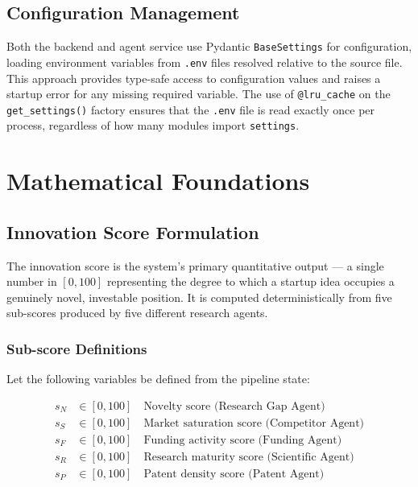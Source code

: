 \documentclass[12pt,a4paper,oneside]{book}
\begin{document}
\section{Configuration Management}

Both the backend and agent service use Pydantic \texttt{BaseSettings} for configuration, loading environment variables from \texttt{.env} files resolved relative to the source file. This approach provides type-safe access to configuration values and raises a startup error for any missing required variable. The use of \texttt{@lru\_cache} on the \texttt{get\_settings()} factory ensures that the \texttt{.env} file is read exactly once per process, regardless of how many modules import \texttt{settings}.

\chapter{Mathematical Foundations}
\label{chap:math}

\section{Innovation Score Formulation}

The innovation score is the system's primary quantitative output — a single number in $[0, 100]$ representing the degree to which a startup idea occupies a genuinely novel, investable position. It is computed deterministically from five sub-scores produced by five different research agents.

\subsection{Sub-score Definitions}

Let the following variables be defined from the pipeline state:

\begin{align}
  s_N     &\in [0,100] \quad \text{Novelty score (Research Gap Agent)} \\
  s_S     &\in [0,100] \quad \text{Market saturation score (Competitor Agent)} \\
  s_F     &\in [0,100] \quad \text{Funding activity score (Funding Agent)} \\
  s_R     &\in [0,100] \quad \text{Research maturity score (Scientific Agent)} \\
  s_P     &\in [0,100] \quad \text{Patent density score (Patent Agent)}
\end{align}
\end{document}
